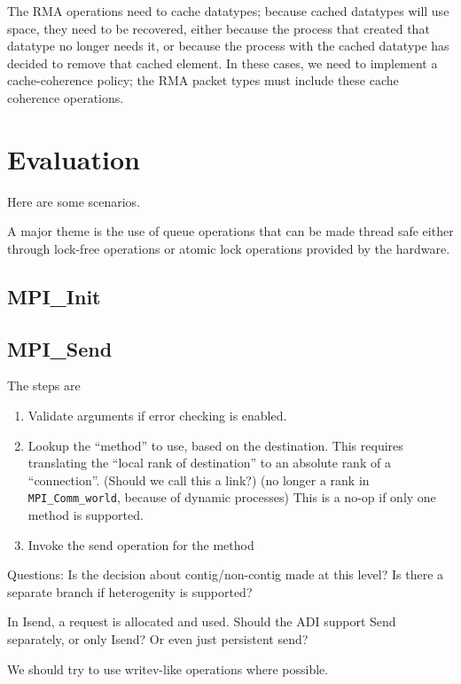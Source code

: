 \documentclass{article}
\let\code=\texttt
\begin{document}
The RMA operations need to cache datatypes; because cached datatypes will use
space, they need to be recovered, either because the process that created that
datatype no longer needs it, or because the process with the cached datatype
has decided to remove that cached element.  In these cases, we need to
implement a cache-coherence policy; the RMA packet types must include these
cache coherence operations.

\section{Evaluation}

Here are some scenarios.

A major theme is the use of queue operations that can be made thread safe
either 
through lock-free operations or atomic lock operations provided by the
hardware.  

\subsection{MPI\_Init}

\subsection{MPI\_Send}
The steps are
\begin{enumerate}
\item Validate arguments if error checking is enabled.
\item Lookup the ``method'' to use, based on the destination.  This requires
  translating the ``local rank of destination'' to an absolute rank of a
  ``connection''. (Should we call this a link?)  (no longer a rank in
  \code{MPI\_Comm\_world}, because of 
  dynamic processes) This is a no-op
  if only one method is supported.
\item Invoke the send operation for the method
\end{enumerate}
Questions: Is the decision about contig/non-contig made at this level?
Is there a separate branch if heterogenity is supported?  

In Isend, a request is allocated and used.  Should the ADI support Send
separately, or only Isend?  Or even just persistent send?

We should try to use writev-like operations where possible.
\end{document}
